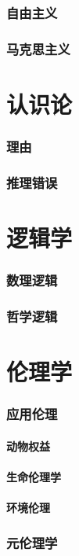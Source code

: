 \documentclass[UTF8]{../RepresentationUniverse}
\begin{document}
    \subsection{自由主义}
    \subsection{马克思主义}


\chapter{认识论}
    \subsection{理由}
    \subsection{推理错误}

\chapter{逻辑学}
    \subsection{数理逻辑}
    \subsection{哲学逻辑}       

\chapter{伦理学}
    \subsection{应用伦理}
        \subsubsection{动物权益}
        \subsubsection{生命伦理学}
        \subsubsection{环境伦理}
    \subsection{元伦理学}
\end{document}
